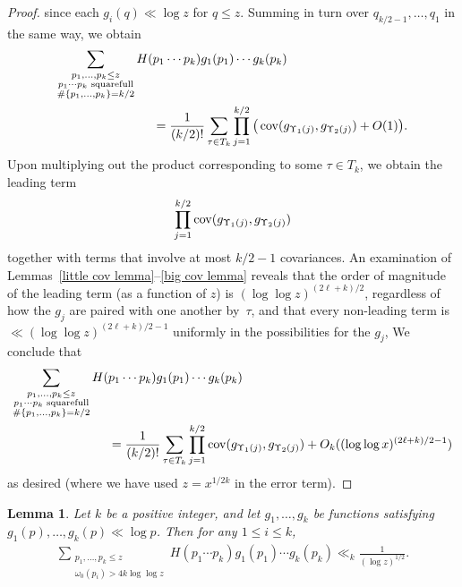\documentclass[12pt,reqno]{amsart}
\newtheorem{lemma}[theorem]{Lemma}
\theoremstyle{definition}
\newcommand{\cov}{\mathop{\rm cov}\nolimits}
\begin{document}
\begin{proof}
since each $g_i(q) \ll \log z$ for $q\le z$.
Summing in turn over $q_{k/2-1},\dots,q_1$ in the same way, we obtain
\begin{align*}
\sum_{\substack{p_1,\dots,p_k\leq z \\ p_1\cdots p_k \text{ squarefull} \\ \#\{p_1,\dots,p_k\} = k/2}} H( & p_1\cdots p_k) g_1(p_1) \cdots g_k(p_k) \\
&= \frac 1{(k/2)!} \sum_{\tau\in T_k} \prod_{j=1}^{k/2} \big( \cov(g_{\Upsilon_1(j)},g_{\Upsilon_2(j)}) + O(1) \big).
\end{align*}
Upon multiplying out the product corresponding to some $\tau \in T_k$, we obtain the leading term
\[
\prod_{j=1}^{k/2} \cov(g_{\Upsilon_1(j)},g_{\Upsilon_2(j)})
\]
together with terms that involve at most $k/2-1$ covariances. An examination of Lemmas~\ref{little cov lemma}--\ref{big cov lemma} reveals that the order of magnitude of the leading term (as a function of $z$) is $(\log\log z)^{(2\ell + k)/2}$, regardless of how the $g_j$ are paired with one another by~$\tau$, and that every non-leading term is $\ll (\log\log z)^{(2\ell + k)/2-1}$ uniformly in the possibilities for the $g_j$, We conclude that
\begin{align*}
\sum_{\substack{p_1,\dots,p_k \leq z \\ p_1\cdots p_k \text{ squarefull} \\ \#\{p_1,\dots,p_k\} = k/2}} H( & p_1\cdots p_k) g_1(p_1) \cdots g_k(p_k) \\
&= \frac 1{(k/2)!} \sum_{\tau\in T_k} \prod_{j=1}^{k/2} \cov(g_{\Upsilon_1(j)},g_{\Upsilon_2(j)}) + O_k((\log\log x)^{(2\ell + k)/2 - 1})
\end{align*}
as desired (where we have used $z = x^{1/2k}$ in the error term).
\end{proof}

\begin{lemma}
\label{one omega0 is big lemma}
Let $k$ be a positive integer, and let $g_1,\dots,g_k$ be functions satisfying $g_1(p),\dots,g_k(p) \ll \log p$. Then for any $1\le i\le k$,
\begin{align*}
\sum_{\substack{p_1,\dots,p_k \leq z \\ \omega_0(p_i) > 4k\log\log z}} H(p_1\cdots p_k) g_1(p_1) \cdots g_k(p_k) \ll_k \frac1{(\log z)^{1/2}}.
\end{align*}
\end{lemma}
\end{document}

